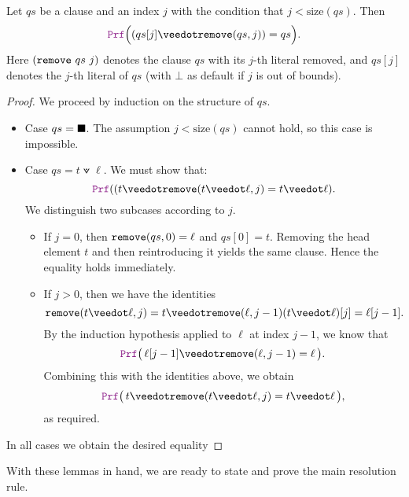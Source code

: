 \begin{lemma}\label{lem:orN_remove}
Let $qs$ be a clause and an index $j$ with the condition that $j < \mathrm{size}(qs)$. Then
\[
  \prf\Bigl((qs[j] \veedot \kw{remove}(qs,j)) = qs\Bigr).
\]
Here $(\texttt{\upshape{remove}}~qs~j)$ denotes the clause $qs$ with its $j$-th literal removed, and
$qs[j]$ denotes the $j$-th literal of $qs$ (with $\bot$ as default if $j$ is out of bounds).
\begin{proof}
We proceed by induction on the structure of $qs$.

\begin{itemize}
  \item[] Case $qs=\blacksquare$.  The assumption $j < \mathrm{size}(qs)$ cannot hold, so this case is impossible.

  \item[] Case $qs= t \veedot \ell$. We must show that:
  \[
    \prf((t \veedot \kw{remove}(t \veedot \ell,j) = t \veedot \ell).
  \]
  We distinguish two subcases according to $j$.
  \begin{itemize}
    \item If $j=0$, then $\texttt{\upshape{remove}}(qs,0)=\ell$ and $qs[0]=t$.
    Removing the head element $t$ and then reintroducing it yields the same clause.
    Hence the equality holds immediately.
    \item If $j>0$, then we have the identities
      \[
        \kw{remove}(t \veedot \ell,j) = t \veedot \kw{remove}(\ell,j-1)\\
        (t \veedot \ell)[j] = \ell[j-1].
      \]
      By the induction hypothesis applied to $\ell$ at index $j-1$, we know that
      \[
        \prf\bigl(\,\ell[j-1] \veedot \kw{remove}(\ell,j-1) = \ell\,\bigr).
      \]
      Combining this with the identities above, we obtain
      \[
        \prf\bigl(\,t \veedot \kw{remove}(t \veedot \ell,j) = t \veedot \ell\,\bigr),
      \]
      as required.
  \end{itemize}
\end{itemize}
In all cases we obtain the desired equality
\end{proof}
\end{lemma}

With these lemmas in hand, we are ready to state and prove the main resolution rule.

